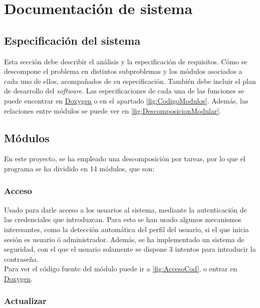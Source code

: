 

\section{Documentación de sistema}

\subsection{Especificación del sistema}

Esta sección debe describir el análisis y la especificación de requisitos. Cómo se descompone el problema en distintos subproblemas y los módulos asociados a cada uno de ellos, acompañados de su especificación. También debe incluir el plan de desarrollo del \textit{software}.
Las especificaciones de cada una de las funciones se puede encontrar en \href{DOC_DOXYGEN/index.html}{Doxygen} o en el apartado \ref{fig:CodigoModulos}.
Además, las relaciones entre módulos se puede ver en \ref{fig:DescomposicionModular}.

\subsection{Módulos}

En este proyecto, se ha empleado una descomposición por tareas, por lo que el programa se ha dividido en 14 módulos, que son:

\subsubsection{Acceso}

Usado para darle acceso a los usuarios al sistema, mediante la autenticación de las credenciales que introduzcan.
Para esto se han usado algunos mecanismos interesantes, como la detección automática del perfil del usuario, si el que inicia sesión es usuario ó administrador.
Además, se ha implementado un sistema de seguridad, con el que el usuario solamente se dispone 3 intentos para introducir la contraseña.\\

Para ver el código fuente del módulo puede ir a \ref{fig:AccesoCod}, o entrar en \href{DOC_DOXYGEN/acceso_8h_source.html}{Doxygen}.
\label{fig:Acceso}

\subsubsection{Actualizar}

